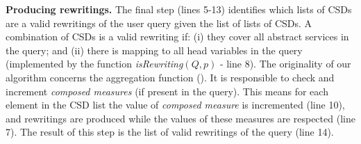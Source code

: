 \noindent \textbf{Producing rewritings.} The final step (lines 5-13) identifies which lists of CSDs are a valid
rewritings of the user query given the list of lists of CSDs.
A combination of CSDs is a valid rewriting if: (i) they cover all abstract services in the query; and 
(ii) there is mapping to all head variables in the query (implemented by the function \textit{isRewriting}$(Q, p)$ - line 8).
The originality of our algorithm concerns the aggregation function ().
It is responsible to check and increment \textit{composed measures} (if present in the query). 
This means for each element in the CSD list the value of \textit{composed measure} is incremented (line 10), and rewritings are produced while the values of these measures are respected (line 7). 
The result of this step is the list of valid 
 rewritings of the query (line 14).%


